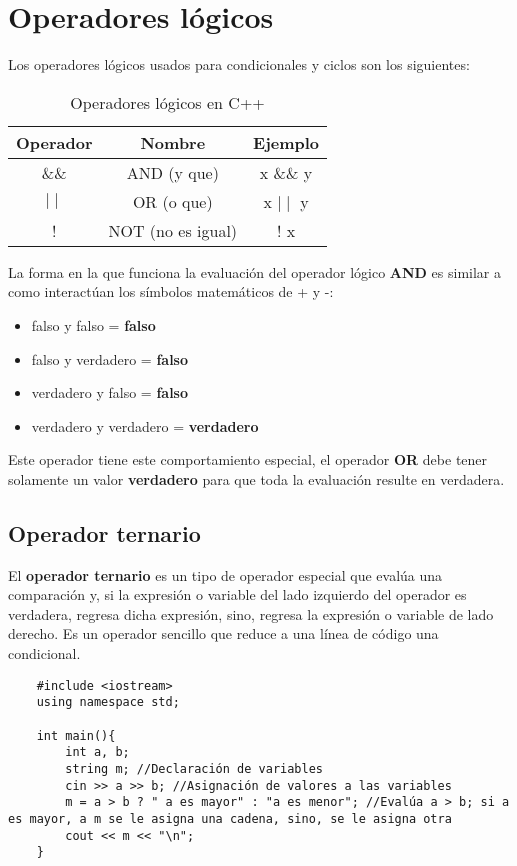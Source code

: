 \section{Operadores lógicos}
\hspace{0.55cm}Los operadores lógicos usados para condicionales y ciclos son los siguientes:
\begin{table}[H]
    \begin{center}
        \caption{Operadores lógicos en C++}
        \label{tab: 4}
        \begin{tabular}{c c c}
            \hline
            \textbf{Operador}&\textbf{Nombre}&\textbf{Ejemplo} \\
            \hline
            \&\&        & AND (y que)       & x \&\& y \\
            $\mid\mid$  & OR (o que)        & x $\mid\mid$ y \\
            !           & NOT (no es igual) & ! x \\
            \hline
        \end{tabular}
    \end{center}
\end{table}

La forma en la que funciona la evaluación del operador lógico \textbf{AND} es similar a como interactúan los símbolos matemáticos de + y -:
\begin{itemize}
    \item falso y falso = \textbf{falso}
    \item falso y verdadero = \textbf{falso}
    \item verdadero y falso = \textbf{falso}
    \item verdadero y verdadero = \textbf{verdadero}
\end{itemize}

Este operador tiene este comportamiento especial, el operador \textbf{OR} debe tener solamente un valor \textbf{verdadero} para que toda la evaluación resulte en verdadera.


\subsection{Operador ternario}
\hspace{0.55cm}El \textbf{operador ternario} es un tipo de operador especial que evalúa una comparación y, si la expresión o variable del lado izquierdo del operador es verdadera, regresa dicha expresión, sino, regresa la expresión o variable de lado derecho. Es un operador sencillo que reduce a una línea de código una condicional.
\begin{lstlisting}
    #include <iostream>
    using namespace std;
    
    int main(){
        int a, b;
        string m; //Declaración de variables
        cin >> a >> b; //Asignación de valores a las variables
        m = a > b ? " a es mayor" : "a es menor"; //Evalúa a > b; si a es mayor, a m se le asigna una cadena, sino, se le asigna otra
        cout << m << "\n";
    }
\end{lstlisting}